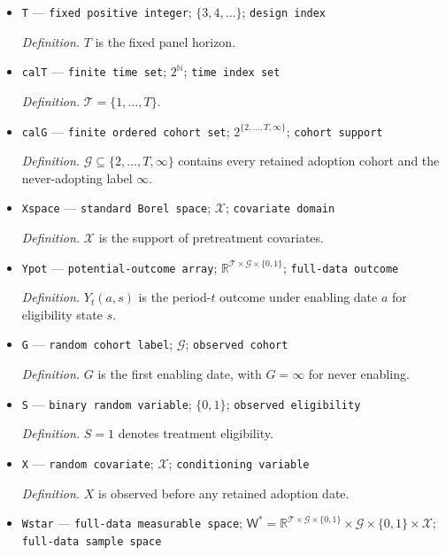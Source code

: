 \documentclass{article}
\begin{document}
\begin{itemize}
  \item \texttt{T} --- \texttt{fixed positive integer}; \(\{3,4,\ldots\}\); \texttt{design index}
  \par\smallskip\noindent\emph{Definition.} \(T\) is the fixed panel horizon.
  \item \texttt{calT} --- \texttt{finite time set}; \(2^{\mathbb N}\); \texttt{time index set}
  \par\smallskip\noindent\emph{Definition.} \(\mathcal T=\{1,\ldots,T\}\).
  \item \texttt{calG} --- \texttt{finite ordered cohort set}; \(2^{\{2,\ldots,T,\infty\}}\); \texttt{cohort support}
  \par\smallskip\noindent\emph{Definition.} \(\mathcal G\subseteq\{2,\ldots,T,\infty\}\) contains every retained adoption cohort and the never-adopting label \(\infty\).
  \item \texttt{Xspace} --- \texttt{standard Borel space}; \(\mathcal X\); \texttt{covariate domain}
  \par\smallskip\noindent\emph{Definition.} \(\mathcal X\) is the support of pretreatment covariates.
  \item \texttt{Ypot} --- \texttt{potential-\allowbreak{}outcome array}; \(\mathbb R^{\mathcal T\times\mathcal G\times\{0,1\}}\); \texttt{full-\allowbreak{}data outcome}
  \par\smallskip\noindent\emph{Definition.} \(Y_t(a,s)\) is the period-\(t\) outcome under enabling date \(a\) for eligibility state \(s\).
  \item \texttt{G} --- \texttt{random cohort label}; \(\mathcal G\); \texttt{observed cohort}
  \par\smallskip\noindent\emph{Definition.} \(G\) is the first enabling date, with \(G=\infty\) for never enabling.
  \item \texttt{S} --- \texttt{binary random variable}; \(\{0,1\}\); \texttt{observed eligibility}
  \par\smallskip\noindent\emph{Definition.} \(S=1\) denotes treatment eligibility.
  \item \texttt{X} --- \texttt{random covariate}; \(\mathcal X\); \texttt{conditioning variable}
  \par\smallskip\noindent\emph{Definition.} \(X\) is observed before any retained adoption date.
  \item \texttt{Wstar} --- \texttt{full-\allowbreak{}data measurable space}; \(\mathsf W^*=\mathbb R^{\mathcal T\times\mathcal G\times\{0,1\}}\times\mathcal G\times\{0,1\}\times\mathcal X\); \texttt{full-\allowbreak{}data sample space}

\end{itemize}
\end{document}
